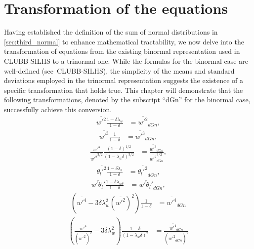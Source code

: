 \section{Transformation of the equations}\label{sec:transformationequations}

Having established the definition of the sum of normal distributions in \cref{sec:third_normal}
to enhance mathematical tractability,
we now delve into the transformation of equations from the existing binormal representation
used in CLUBB-SILHS\autocite{larson2022clubbsilhs} to a trinormal one.
While the formulas for the binormal case are well-defined (see~CLUBB-SILHS\autocite{larson2022clubbsilhs}),
the simplicity of the means and standard deviations employed in the trinormal representation suggests
the existence of a specific transformation that holds true.
This chapter will demonstrate that the following transformations,
denoted by the subscript \enquote{dGn} for the binormal case,
successfully achieve this conversion.
\begin{align}
    \overline{w'^2} \frac{1 - \delta\lambda_w}{1 - \delta}
    &= \overline{w'^2}_{dGn}, \label{eq:w_prime_2_transform}
\end{align}
\begin{align}
    \overline{w'^3} \frac{1}{1 - \delta}
    &= \overline{w'^3}_{dGn}, \label{eq:w_prime_3_transform}
\end{align}
\begin{align}
    \frac{\overline{w'^3}}{\overline{w'^2}^{3/2}} \frac{(1 - \delta)^{1/2}}{(1 - \lambda_w\delta)^{3/2}}
    &= \frac{\overline{w'^3}_{dGn}}{\overline{w'^2}_{dGn}^{3/2}}, \label{eq:w_prime_3_div_w_prime_2_transform}
\end{align}
\begin{align}
    \overline{\theta_l'^2} \frac{1 - \delta\lambda_\theta}{1 - \delta}
    &= \overline{\theta_l'^2}_{dGn}, \label{eq:theta_l_prime_transform}
\end{align}
\begin{align}
    \overline{w'\theta_l'} \frac{1 - \delta\lambda_{w\theta}}{1 - \delta}
    &= \overline{w'\theta_l'}_{dGn}, \label{eq:w_prime_theta_l_prime_transform}
\end{align}
\begin{align}
    \left(\overline{w'^4} - 3\delta\lambda_w^2 \left(\overline{w'^2}\right)^2\right) \frac{1}{1 - \delta}
    &= \overline{w'^4}_{dGn} \label{eq:w_prime_4_transform}
\end{align}
\begin{align}
    \left(\frac{\overline{w'^4}}{(\overline{w'^2})^2} - 3\delta\lambda_w^2 \right) \frac{1 - \delta}{(1 - \lambda_w\delta)^2}
    &= \frac{\overline{w'^4}_{dGn}}{(\overline{w'^2}_{dGn})^2} \label{eq:w_prime_4_div_w_prime_2_transform}
\end{align}
